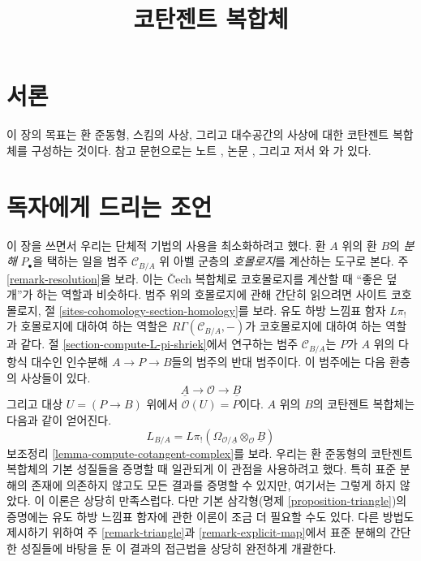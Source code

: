 

%


\title{코탄젠트 복합체}


\maketitle

\label{section-phantom}

\tableofcontents

\section{서론}
\label{section-introduction}

\noindent
이 장의 목표는 환 준동형, 스킴의 사상, 그리고 대수공간의 사상에 대한
코탄젠트 복합체를 구성하는 것이다. 참고 문헌으로는 노트
\cite{quillenhomology}, 논문 \cite{quillencohomology}, 그리고 저서
\cite{Andre}와 \cite{cotangent}가 있다.




\section{독자에게 드리는 조언}
\label{section-advice-reader}

\noindent
이 장을 쓰면서 우리는 단체적 기법의 사용을 최소화하려고 했다. 환 $A$
위의 환 $B$의 {\it 분해} $P_\bullet$을 택하는 일을 범주
$\mathcal{C}_{B/A}$ 위 아벨 군층의 {\it 호몰로지}를 계산하는 도구로 본다.
주 \ref{remark-resolution}을 보라. 이는 {\v C}ech 복합체로 코호몰로지를
계산할 때 ``좋은 덮개''가 하는 역할과 비슷하다. 범주 위의 호몰로지에
관해 간단히 읽으려면 사이트 코호몰로지, 절
\ref{sites-cohomology-section-homology}를 보라. 유도 하방 느낌표 함자
$L\pi_!$가 호몰로지에 대하여 하는 역할은
$R\Gamma(\mathcal{C}_{B/A}, -)$가 코호몰로지에 대하여 하는 역할과 같다.
절 \ref{section-compute-L-pi-shriek}에서 연구하는 범주
$\mathcal{C}_{B/A}$는 $P$가 $A$ 위의 다항식 대수인 인수분해
$A \to P \to B$들의 범주의 반대 범주이다. 이 범주에는 다음 환층의
사상들이 있다.
$$
\underline{A} \longrightarrow \mathcal{O} \longrightarrow \underline{B}
$$
그리고 대상 $U=(P\to B)$ 위에서 $\mathcal{O}(U)=P$이다. $A$ 위의
$B$의 코탄젠트 복합체는 다음과 같이 얻어진다.
$$
L_{B/A} =
L\pi_!(\Omega_{\mathcal{O}/\underline{A}} \otimes_\mathcal{O} \underline{B})
$$
보조정리 \ref{lemma-compute-cotangent-complex}를 보라. 우리는 환 준동형의
코탄젠트 복합체의 기본 성질들을 증명할 때 일관되게 이 관점을 사용하려고
했다. 특히 표준 분해의 존재에 의존하지 않고도 모든 결과를 증명할 수
있지만, 여기서는 그렇게 하지 않았다. 이 이론은 상당히 만족스럽다.
다만 기본 삼각형(명제 \ref{proposition-triangle})의 증명에는 유도 하방
느낌표 함자에 관한 이론이 조금 더 필요할 수도 있다. 다른 방법도 제시하기
위하여 주 \ref{remark-triangle}과 \ref{remark-explicit-map}에서 표준
분해의 간단한 성질들에 바탕을 둔 이 결과의 접근법을 상당히 완전하게
개괄한다.

